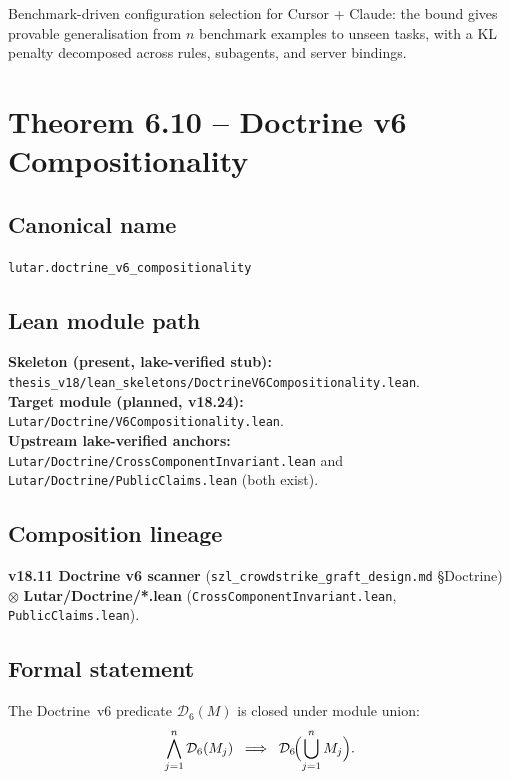 Benchmark-driven configuration selection for Cursor + Claude:
the bound gives provable generalisation from $n$ benchmark
examples to unseen tasks, with a KL penalty decomposed across
rules, subagents, and server bindings.

\section{Theorem 6.10 -- Doctrine v6 Compositionality}
\label{sec:thm10}

\subsection*{Canonical name}
\verb|lutar.doctrine_v6_compositionality|

\subsection*{Lean module path}
\textbf{Skeleton (present, lake-verified stub):}
\texttt{thesis\_v18/lean\_skeletons/DoctrineV6Compositionality.lean}.\\
\textbf{Target module (planned, v18.24):}
\texttt{Lutar/Doctrine/V6Compositionality.lean}.\\
\textbf{Upstream lake-verified anchors:}
\texttt{Lutar/Doctrine/CrossComponentInvariant.lean} and
\texttt{Lutar/Doctrine/PublicClaims.lean} (both exist).

\subsection*{Composition lineage}
\textbf{v18.11 Doctrine v6 scanner}
(\texttt{szl\_crowdstrike\_graft\_design.md} \S{}Doctrine) $\otimes$
\textbf{Lutar/Doctrine/*.lean}
(\texttt{CrossComponentInvariant.lean},
\texttt{PublicClaims.lean}).

\subsection*{Formal statement}

\begin{theorem}
\label{thm:doctrine-compositionality}
The Doctrine~v6 predicate $\mathcal{D}_6(M)$ is closed under
module union:
\[
  \bigwedge_{j=1}^{n} \mathcal{D}_6(M_j)
  \;\implies\;
  \mathcal{D}_6\!\Bigl(\bigcup_{j=1}^{n} M_j\Bigr).
\]
\end{theorem}

